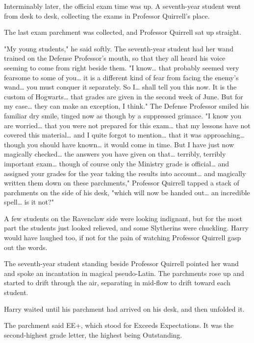 Interminably later, the official exam time was up. A seventh-year student went
from desk to desk, collecting the exams in Professor Quirrell's place.

The last exam parchment was collected, and Professor Quirrell sat up straight.

"My young students," he said softly. The seventh-year student had her wand
trained on the Defense Professor's mouth, so that they all heard his voice
seeming to come from right beside them. "I know{\ldots} that probably seemed
very fearsome to some of you{\ldots} it is a different kind of fear from facing
the enemy's wand{\ldots} you must conquer it separately. So I{\ldots} shall
tell you this now. It is the custom of Hogwarts{\ldots} that grades are given
in the second week of June. But for my case{\ldots} they can make an exception,
I think." The Defense Professor smiled his familiar dry smile, tinged now as
though by a suppressed grimace. "I know you are worried{\ldots} that you were
not prepared for this exam{\ldots} that my lessons have not covered this
material{\ldots} and I quite forgot to mention{\ldots} that it was
approaching{\ldots} though you should have known{\ldots} it would come in time.
But I have just now magically checked{\ldots} the answers you have given on
that{\ldots} terribly, terribly important exam{\ldots} though of course
only the Ministry grade is official{\ldots} and assigned your grades for the year
taking the results into account{\ldots} and magically written them
down on these parchments," Professor Quirrell tapped a stack of parchments on
the side of his desk, "which will now be handed out{\ldots} an incredible
spell{\ldots} is it not?"

A few students on the Ravenclaw side were looking indignant, but for the most
part the students just looked relieved, and some Slytherins were chuckling.
Harry would have laughed too, if not for the pain of watching Professor
Quirrell gasp out the words.

The seventh-year student standing beside Professor Quirrell pointed her wand
and spoke an incantation in magical pseudo-Latin. The parchments rose up and
started to drift through the air, separating in mid-flow to drift toward each
student.

Harry waited until his parchment had arrived on his desk, and then unfolded it.

The parchment said EE+, which stood for Exceeds Expectations. It was the
second-highest grade letter, the highest being Outstanding.

